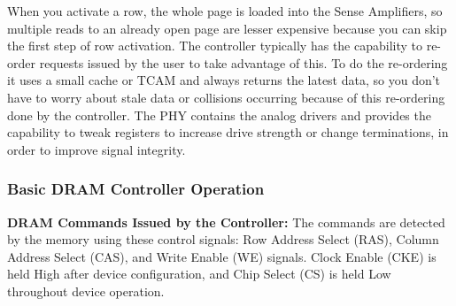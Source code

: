 \par When you activate a row, the whole page is loaded into the Sense Amplifiers, so multiple reads to an already open page are lesser expensive because you can skip the first step of row activation. The controller typically has the capability to re-order requests issued by the user to take advantage of this. To do the re-ordering it uses a small cache or TCAM and always returns the latest data, so you don't have to worry about stale data or collisions occurring because of this re-ordering done by the controller. The PHY contains the analog drivers and provides the capability to tweak registers to increase drive strength or change terminations, in order to improve signal integrity.



\subsubsection{Basic DRAM Controller Operation}

\textbf{DRAM Commands Issued by the Controller:} The commands are detected by the memory using these control signals: Row Address Select (RAS), Column Address Select (CAS), and Write Enable (WE) signals. Clock Enable (CKE) is held High after device configuration, and Chip Select (CS) is held Low throughout device operation.

